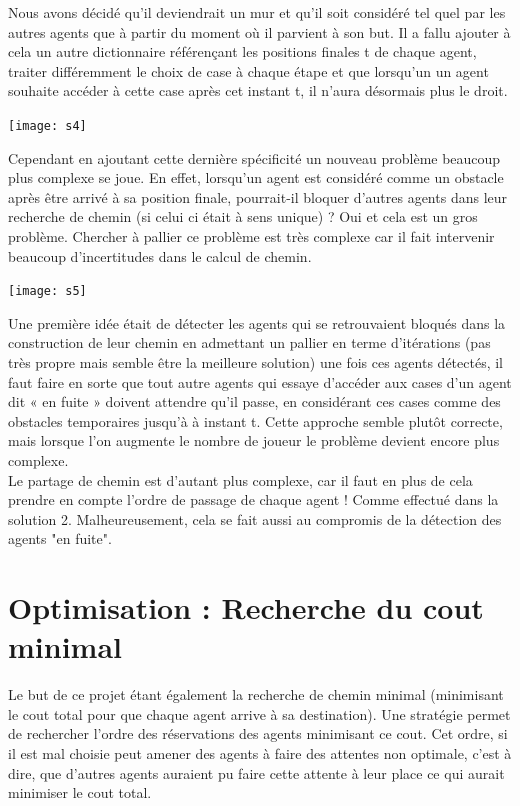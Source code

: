 \documentclass{article}
\begin{document}
Nous avons décidé qu’il deviendrait un mur et qu’il soit considéré tel quel par les autres agents que à partir du moment où il parvient à son but. Il a fallu ajouter à cela un autre dictionnaire référençant les positions finales t de chaque agent, traiter différemment le choix de case à chaque étape et que lorsqu’un un agent souhaite accéder à cette case après cet instant t, il n’aura désormais plus le droit. 
\\
\begin{center}
	\texttt{[image: s4]}
\end{center}

Cependant en ajoutant cette dernière spécificité un nouveau problème beaucoup plus complexe se joue. En effet, lorsqu’un agent est considéré comme un obstacle après être arrivé à sa position finale, pourrait-il bloquer d’autres agents dans leur recherche de chemin (si celui ci était à sens unique) ? Oui et cela est un gros problème. Chercher à pallier ce problème est très complexe car il fait intervenir beaucoup d’incertitudes dans le calcul de chemin. \\

\begin{center}
	\texttt{[image: s5]}
\end{center}

Une première idée était de détecter les agents qui se retrouvaient bloqués dans la construction de leur chemin en admettant un pallier en terme d’itérations (pas très propre mais semble être la meilleure solution) une fois ces agents détectés, il faut faire en sorte que tout autre agents qui essaye d’accéder aux cases d’un agent dit « en fuite » doivent attendre qu’il passe, en considérant ces cases comme des obstacles temporaires jusqu'à à instant t. Cette approche semble plutôt correcte, mais lorsque l'on augmente le nombre de joueur le problème devient encore plus complexe.\\

Le partage de chemin est d'autant plus complexe, car il faut en plus de cela prendre en compte l'ordre de passage de chaque agent ! Comme effectué dans la solution 2. Malheureusement, cela se fait aussi au compromis de la détection des agents "en fuite".

\section{Optimisation : Recherche du cout minimal}

Le but de ce projet étant également la recherche de chemin minimal (minimisant le cout total pour que chaque agent arrive à sa destination). Une stratégie permet de rechercher l'ordre des réservations des agents minimisant ce cout.  Cet ordre, si il est mal choisie peut amener des agents à faire des attentes non optimale, c'est à dire, que d'autres agents auraient pu faire cette attente à leur place ce qui aurait minimiser le cout total.\\ \\
\end{document}
